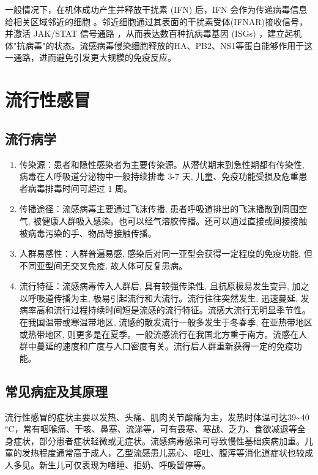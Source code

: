 \documentclass[9pt,a4paper,twoside]{rho-class/rho}
\begin{document}
    一般情况下，在机体成功产生并释放干扰素 (IFN) 后，IFN 会作为传递病毒信息给相关区域邻近的细胞 。邻近细胞通过其表面的干扰素受体(IFNAR)接收信号，并激活 JAK/STAT 信号通路 ，从而表达数百种抗病毒基因 (ISGs) ，建立起机体"抗病毒"的状态。流感病毒侵染细胞释放的HA、PB2、NS1等蛋白能够作用于这一通路，进而避免引发更大规模的免疫反应。


\section{流行性感冒}

\subsection{流行病学}

    \begin{enumerate}
    \item 传染源：患者和隐性感染者为主要传染源。从潜伏期末到急性期都有传染性, 病毒在人呼吸道分泌物中一般持续排毒 3-7 天, 儿童、免疫功能受损及危重患者病毒排毒时间可超过 1 周。
    \item 传播途径：流感病毒主要通过飞沫传播, 患者呼吸道排出的飞沫播散到周围空气, 被健康人群吸入感染。也可以经气溶胶传播。还可以通过直接或间接接触被病毒污染的手、物品等接触传播。
    \item 人群易感性：人群普遍易感, 感染后对同一亚型会获得一定程度的免疫功能, 但不同亚型间无交叉免疫, 故人体可反复患病。
    \item 流行特征：流感病毒传入人群后, 具有较强传染性, 且抗原极易发生变异, 加之以呼吸道传播为主, 极易引起流行和大流行。流行往往突然发生, 迅速蔓延, 发病率高和流行过程持续时间短是流感的流行特征。流感大流行无明显季节性。在我国温带或寒温带地区, 流感的散发流行一般多发生于冬春季, 在亚热带地区或热带地区, 则更多是在夏季。一般流感流行在我国北方重于南方。流感在人群中蔓延的速度和广度与人口密度有关。流行后人群重新获得一定的免疫功能。
    \end{enumerate}

\subsection{常见病症及其原理}

    流行性感冒的症状主要以发热、头痛、肌肉关节酸痛为主，发热时体温可达39\textasciitilde40$^o\mathrm{C}$，常有咽喉痛、干咳、鼻塞、流涕等，可有畏寒、寒战、乏力、食欲减退等全身症状，部分患者症状轻微或无症状。流感病毒感染可导致慢性基础疾病加重。儿童的发热程度通常高于成人，乙型流感患儿恶心、呕吐、腹泻等消化道症状也较成人多见。新生儿可仅表现为嗜睡、拒奶、呼吸暂停等。
\end{document}
